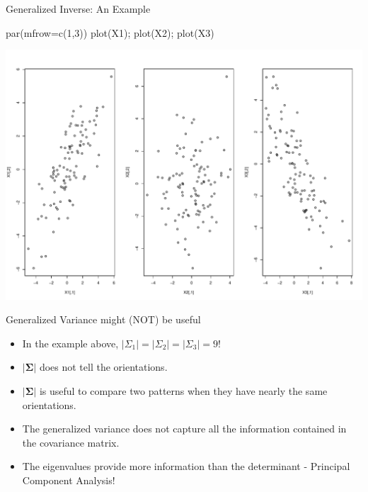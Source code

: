 \documentclass[
  ignorenonframetext,
]{beamer}
\newenvironment{Shaded}{\begin{snugshade}}{\end{snugshade}}
\newcommand{\AttributeTok}[1]{\textcolor[rgb]{0.77,0.63,0.00}{#1}}
\newcommand{\DecValTok}[1]{\textcolor[rgb]{0.00,0.00,0.81}{#1}}
\newcommand{\FunctionTok}[1]{\textcolor[rgb]{0.00,0.00,0.00}{#1}}
\newcommand{\NormalTok}[1]{#1}
\providecommand{\tightlist}{%
  \setlength{\itemsep}{0pt}\setlength{\parskip}{0pt}}
\begin{document}
\begin{frame}[fragile]{Generalized Inverse: An Example}
\protect\hypertarget{generalized-inverse-an-example-1}{}
\begin{Shaded}
\begin{Highlighting}[]
\FunctionTok{par}\NormalTok{(}\AttributeTok{mfrow=}\FunctionTok{c}\NormalTok{(}\DecValTok{1}\NormalTok{,}\DecValTok{3}\NormalTok{))}
\FunctionTok{plot}\NormalTok{(X1); }\FunctionTok{plot}\NormalTok{(X2); }\FunctionTok{plot}\NormalTok{(X3)}
\end{Highlighting}
\end{Shaded}

\includegraphics[width=1\linewidth,height=0.5\textheight]{Lecture04_files/figure-beamer/unnamed-chunk-11-1}
\end{frame}

\begin{frame}{Generalized Variance might (NOT) be useful}
\protect\hypertarget{generalized-variance-might-not-be-useful}{}
\begin{itemize}
\tightlist
\item
  In the example above, \(|\Sigma_1|=|\Sigma_2|=|\Sigma_3|=9\)!
\item
  \(|\boldsymbol \Sigma|\) does not tell the orientations.
\item
  \(|\boldsymbol \Sigma|\) is useful to compare two patterns when they
  have nearly the same orientations.
\item
  The generalized variance does not capture all the information
  contained in the covariance matrix.
\item
  The eigenvalues provide more information than the determinant -
  Principal Component Analysis!
\end{itemize}
\end{frame}
\end{document}
